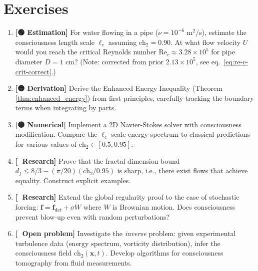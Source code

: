 \section{Exercises}

\begin{enumerate}
\item \textbf{[🟢 Estimation]} For water flowing in a pipe ($\nu = 10^{-6}$ m$^2$/s), estimate the consciousness length scale $\ell_c$ assuming $\text{ch}_2 = 0.90$. At what flow velocity $U$ would you reach the critical Reynolds number $\text{Re}_c \approx 3.28 \times 10^5$ for pipe diameter $D = 1$ cm? (Note: corrected from prior $2.13 \times 10^5$, see eq.~\eqref{eq:re-c-crit-correct}.)

\item \textbf{[🟡 Derivation]} Derive the Enhanced Energy Inequality (Theorem \ref{thm:enhanced_energy}) from first principles, carefully tracking the boundary terms when integrating by parts.

\item \textbf{[🟡 Numerical]} Implement a 2D Navier-Stokes solver with consciousness modification. Compare the $\ell_c$-scale energy spectrum to classical predictions for various values of $\text{ch}_2 \in [0.5, 0.95]$.

\item \textbf{[🔴 Research]} Prove that the fractal dimension bound $d_f \leq 8/3 - (\pi/20)(\text{ch}_2/0.95)$ is sharp, i.e., there exist flows that achieve equality. Construct explicit examples.

\item \textbf{[🔴 Research]} Extend the global regularity proof to the case of stochastic forcing: $\mathbf{f} = \mathbf{f}_{\text{det}} + \sigma \dot{W}$ where $W$ is Brownian motion. Does consciousness prevent blow-up even with random perturbations?

\item \textbf{[🔴 Open problem]} Investigate the \emph{inverse} problem: given experimental turbulence data (energy spectrum, vorticity distribution), infer the consciousness field $\text{ch}_2(\mathbf{x}, t)$. Develop algorithms for consciousness tomography from fluid measurements.
\end{enumerate}

